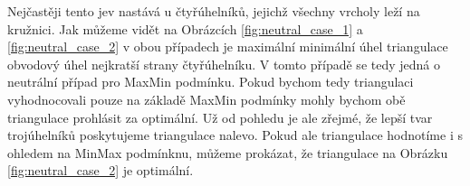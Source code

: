 \documentclass[12pt,a4paper]{article}
\begin{document}
\begin{figure}[h!]
\centering
\begin{floatrow}
\end{floatrow}
\end{figure}


Nejčastěji tento jev nastává u čtyřúhelníků, jejichž všechny vrcholy leží na kružnici. Jak můžeme vidět na Obrázcích \ref{fig:neutral_case_1} a \ref{fig:neutral_case_2} v obou případech je maximální minimální úhel triangulace obvodový úhel nejkratší strany čtyřúhelníku. V tomto případě se tedy jedná o neutrální případ pro MaxMin podmínku. Pokud bychom tedy triangulaci vyhodnocovali pouze na základě MaxMin podmínky mohly bychom obě triangulace prohlásit za optimální. Už od pohledu je ale zřejmé, že lepší tvar trojúhelníků poskytujeme triangulace nalevo. Pokud ale triangulace hodnotíme i s ohledem na MinMax podmínknu, můžeme prokázat, že triangulace na Obrázku \ref{fig:neutral_case_2} je optimální.

\end{document}

